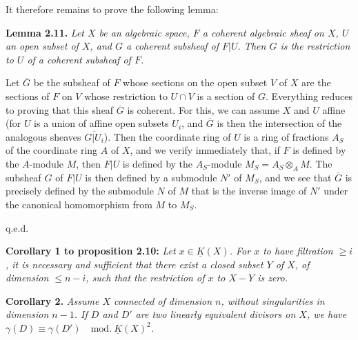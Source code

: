 It therefore remains to prove the following lemma:

\textbf{Lemma 2.11.} \emph{Let $X$ be an algebraic space, $F$ a coherent algebraic sheaf on $X$, $U$ an open subset of $X$, and $G$ a coherent subsheaf of $F|U$. Then $G$ is the restriction to $U$ of a coherent subsheaf of $F$.}

Let $\overline G$ be the subsheaf of $F$ whose sections on the open subset $V$ of $X$ are the sections of $F$ on $V$ whose restriction to $U\cap V$ is a section of $G$. Everything reduces to proving that this sheaf $\overline G$ is coherent. For this, we can assume $X$ and $U$ affine (for $U$ is a union of affine open subsets $U_i$, and $\overline G$ is then the intersection of the analogous sheaves $\overline{G|U_i}$). Then the coordinate ring of $U$ is a ring of fractions $A_S$ of the coordinate ring $A$ of $X$, and we verify immediately that, if $F$ is defined by the $A$-module $M$, then $F|U$ is defined by the $A_S$-module $M_S=A_S\otimes_A M$. The subsheaf $G$ of $F|U$ is then defined by a submodule $N'$ of $M_S$, and we see that $\overline G$ is precisely defined by the submodule $N$ of $M$ that is the inverse image of $N'$ under the canonical homomorphism from $M$ to $M_S$.
\begin{flushright}q.e.d.\end{flushright}

\textbf{Corollary 1 to proposition 2.10:} \emph{Let $x\in\underline K(X)$. For $x$ to have filtration $\geq i$, it is necessary and sufficient that there exist a closed subset $Y$ of $X$, of dimension $\leq n-i$, such that the restriction of $x$ to $X-Y$ is zero.}

%
\textbf{Corollary 2.} \emph{Assume $X$ connected of dimension $n$, without singularities in dimension $n-1$. If $D$ and $D'$ are two linearly equivalent divisors on $X$, we have $\gamma(D)\equiv\gamma(D')\quad\mathrm{mod.}\ \underline K(X)^2$.}

